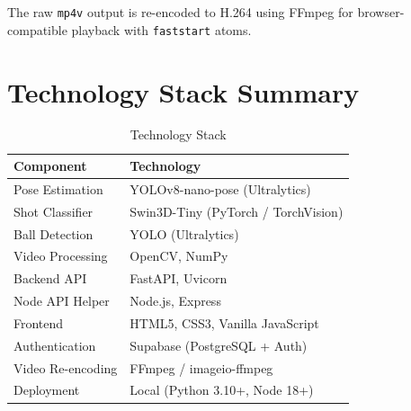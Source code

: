\begin{justify}
\par The raw \texttt{mp4v} output is re-encoded to H.264 using FFmpeg \cite{FFmpeg2024} for browser-compatible playback with \texttt{faststart} atoms.

\section{Technology Stack Summary}

\begin{table}[ht]
\centering
\caption{Technology Stack}
\label{tab:techstack}
\begin{tabular}{l l}
 \hline
 \textbf{Component} & \textbf{Technology} \\
 \hline
 Pose Estimation & YOLOv8-nano-pose (Ultralytics) \\
 Shot Classifier & Swin3D-Tiny (PyTorch / TorchVision) \\
 Ball Detection & YOLO (Ultralytics) \\
 Video Processing & OpenCV, NumPy \\
 Backend API & FastAPI, Uvicorn \\
 Node API Helper & Node.js, Express \\
 Frontend & HTML5, CSS3, Vanilla JavaScript \\
 Authentication & Supabase (PostgreSQL + Auth) \\
 Video Re-encoding & FFmpeg / imageio-ffmpeg \\
 Deployment & Local (Python 3.10+, Node 18+) \\
 \hline
\end{tabular}
\end{table}

\end{justify}
